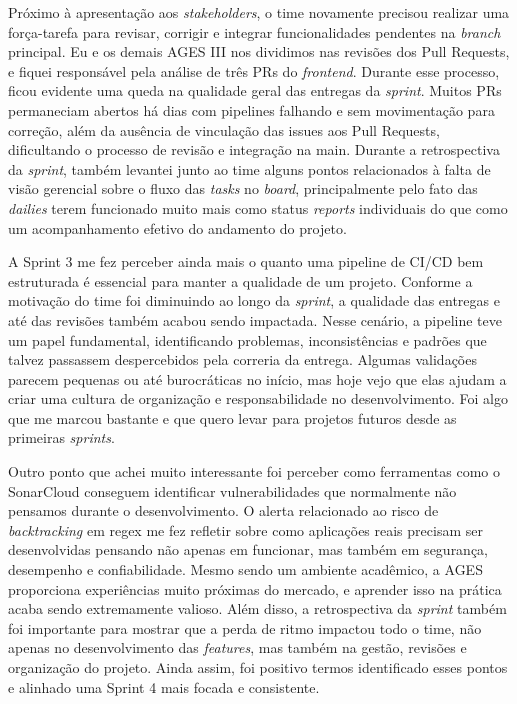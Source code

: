 \indent Próximo à apresentação aos \textit{stakeholders}, o time novamente precisou realizar uma força-tarefa para revisar, corrigir e integrar funcionalidades pendentes na \textit{branch} principal. Eu e os demais AGES III nos dividimos nas revisões dos Pull Requests, e fiquei responsável pela análise de três PRs do \textit{frontend}. Durante esse processo, ficou evidente uma queda na qualidade geral das entregas da \textit{sprint}. Muitos PRs permaneciam abertos há dias com pipelines falhando e sem movimentação para correção, além da ausência de vinculação das issues aos Pull Requests, dificultando o processo de revisão e integração na main. Durante a retrospectiva da \textit{sprint}, também levantei junto ao time alguns pontos relacionados à falta de visão gerencial sobre o fluxo das \textit{tasks} no \textit{board}, principalmente pelo fato das \textit{dailies} terem funcionado muito mais como status \textit{reports} individuais do que como um acompanhamento efetivo do andamento do projeto.\par

\begin{reflection}
\indent \originaltab{}A Sprint 3 me fez perceber ainda mais o quanto uma pipeline de CI/CD bem estruturada é essencial para manter a qualidade de um projeto. Conforme a motivação do time foi diminuindo ao longo da \textit{sprint}, a qualidade das entregas e até das revisões também acabou sendo impactada. Nesse cenário, a pipeline teve um papel fundamental, identificando problemas, inconsistências e padrões que talvez passassem despercebidos pela correria da entrega. Algumas validações parecem pequenas ou até burocráticas no início, mas hoje vejo que elas ajudam a criar uma cultura de organização e responsabilidade no desenvolvimento. Foi algo que me marcou bastante e que quero levar para projetos futuros desde as primeiras \textit{sprints}.\par

\indent \originaltab{}Outro ponto que achei muito interessante foi perceber como ferramentas como o SonarCloud conseguem identificar vulnerabilidades que normalmente não pensamos durante o desenvolvimento. O alerta relacionado ao risco de \textit{backtracking} em regex me fez refletir sobre como aplicações reais precisam ser desenvolvidas pensando não apenas em funcionar, mas também em segurança, desempenho e confiabilidade. Mesmo sendo um ambiente acadêmico, a AGES proporciona experiências muito próximas do mercado, e aprender isso na prática acaba sendo extremamente valioso. Além disso, a retrospectiva da \textit{sprint} também foi importante para mostrar que a perda de ritmo impactou todo o time, não apenas no desenvolvimento das \textit{features}, mas também na gestão, revisões e organização do projeto. Ainda assim, foi positivo termos identificado esses pontos e alinhado uma Sprint 4 mais focada e consistente.\par

\end{reflection}
